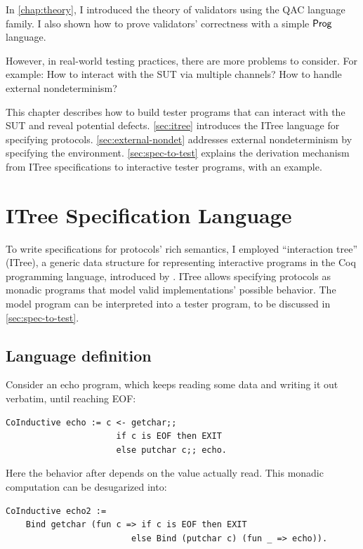 In \autoref{chap:theory}, I introduced the theory of validators using the QAC
language family.  I also shown how to prove validators' correctness with a
simple $\mathsf{Prog}$ language.

However, in real-world testing practices, there are more problems to consider.
For example: How to interact with the SUT via multiple channels?  How to handle
external nondeterminism?

This chapter describes how to build tester programs that can interact with the
SUT and reveal potential defects.  \autoref{sec:itree} introduces the ITree
language for specifying protocols.  \autoref{sec:external-nondet} addresses
external nondeterminism by specifying the environment.
\autoref{sec:spec-to-test} explains the derivation mechanism from ITree
specifications to interactive tester programs, with an \http example.

\section{ITree Specification Language}
\label{sec:itree}
To write specifications for protocols' rich semantics, I employed ``interaction
tree'' (ITree), a generic data structure for representing interactive programs
in the Coq programming language, introduced by \textcite{itree}.  ITree allows
specifying protocols as monadic programs that model valid implementations'
possible behavior.  The model program can be interpreted into a tester program,
to be discussed in \autoref{sec:spec-to-test}.

\subsection{Language definition}
\label{sec:itree-lang}
Consider an echo program, which keeps reading some data and writing it out
verbatim, until reaching EOF:
\begin{lstlisting}[style=customcoq]
  CoInductive echo := c <- getchar;;
                      if c is EOF then EXIT
                      else putchar c;; echo.
\end{lstlisting}

Here the behavior after  depends on the value actually read.  This
monadic computation can be desugarized into:
\begin{lstlisting}[style=customcoq]
  CoInductive echo2 :=
    Bind getchar (fun c => if c is EOF then EXIT
                         else Bind (putchar c) (fun _ => echo)).
\end{lstlisting}

